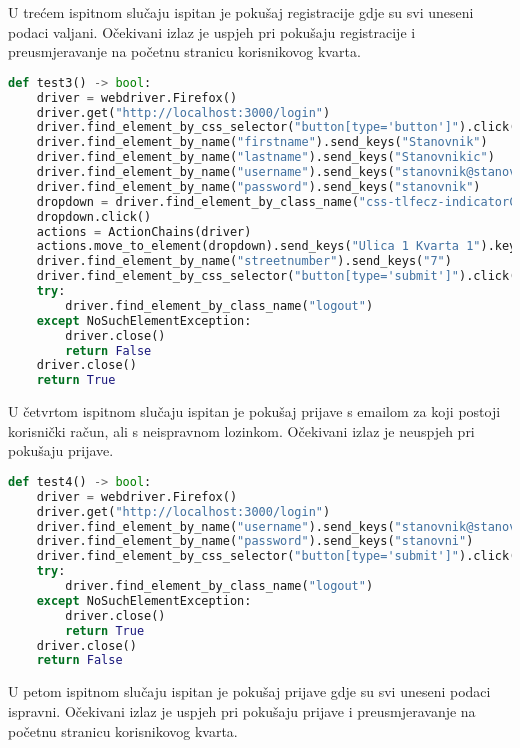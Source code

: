 			U trećem ispitnom slučaju ispitan je pokušaj registracije gdje su svi uneseni podaci valjani. Očekivani izlaz je uspjeh pri pokušaju registracije i preusmjeravanje na početnu stranicu korisnikovog kvarta.

			\begin{lstlisting}[language=Python, breaklines=true]
def test3() -> bool:
    driver = webdriver.Firefox()
    driver.get("http://localhost:3000/login")
    driver.find_element_by_css_selector("button[type='button']").click()
    driver.find_element_by_name("firstname").send_keys("Stanovnik")
    driver.find_element_by_name("lastname").send_keys("Stanovnikic")
    driver.find_element_by_name("username").send_keys("stanovnik@stanovnik.com")
    driver.find_element_by_name("password").send_keys("stanovnik")
    dropdown = driver.find_element_by_class_name("css-tlfecz-indicatorContainer")
    dropdown.click()
    actions = ActionChains(driver)
    actions.move_to_element(dropdown).send_keys("Ulica 1 Kvarta 1").key_down(Keys.ENTER).key_up(Keys.ENTER).perform()
    driver.find_element_by_name("streetnumber").send_keys("7")
    driver.find_element_by_css_selector("button[type='submit']").click()
    try:
        driver.find_element_by_class_name("logout")
    except NoSuchElementException:
        driver.close()
        return False
    driver.close()
    return True
			\end{lstlisting}

			U četvrtom ispitnom slučaju ispitan je pokušaj prijave s emailom za koji postoji korisnički račun, ali s neispravnom lozinkom. Očekivani izlaz je neuspjeh pri pokušaju prijave.

			\begin{lstlisting}[language=Python, breaklines=true]
def test4() -> bool:
    driver = webdriver.Firefox()
    driver.get("http://localhost:3000/login")
    driver.find_element_by_name("username").send_keys("stanovnik@stanovnik.com")
    driver.find_element_by_name("password").send_keys("stanovni")
    driver.find_element_by_css_selector("button[type='submit']").click()
    try:
        driver.find_element_by_class_name("logout")
    except NoSuchElementException:
        driver.close()
        return True
    driver.close()
    return False
			\end{lstlisting}

			U petom ispitnom slučaju ispitan je pokušaj prijave gdje su svi uneseni podaci ispravni. Očekivani izlaz je uspjeh pri pokušaju prijave i preusmjeravanje na početnu stranicu korisnikovog kvarta.

